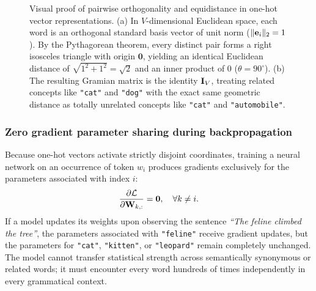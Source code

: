 \documentclass[../../../main.tex]{subfiles}
\begin{document}
\begin{figure}[htbp]
\caption{Visual proof of pairwise orthogonality and equidistance in one-hot vector representations. (a) In $V$-dimensional Euclidean space, each word is an orthogonal standard basis vector of unit norm ($\|\mathbf{e}_i\|_2 = 1$). By the Pythagorean theorem, every distinct pair forms a right isosceles triangle with origin $\mathbf{0}$, yielding an identical Euclidean distance of $\sqrt{1^2 + 1^2} = \sqrt{2}$ and an inner product of $0$ ($\theta = 90^\circ$). (b) The resulting Gramian matrix is the identity $\mathbf{I}_V$, treating related concepts like \texttt{"cat"} and \texttt{"dog"} with the exact same geometric distance as totally unrelated concepts like \texttt{"cat"} and \texttt{"automobile"}.}
\label{fig:onehot_orthogonality_geometry}
\end{figure}

\subsubsection{Zero gradient parameter sharing during backpropagation}
Because one-hot vectors activate strictly disjoint coordinates, training a neural network on an occurrence of token $w_i$ produces gradients exclusively for the parameters associated with index $i$:
\begin{equation}
\label{eq:weight_update_isolation}
\frac{\partial \mathcal{L}}{\partial \mathbf{W}_{k, :}} = \mathbf{0}, \quad \forall k \neq i.
\end{equation}
If a model updates its weights upon observing the sentence \emph{``The feline climbed the tree''}, the parameters associated with \texttt{"feline"} receive gradient updates, but the parameters for \texttt{"cat"}, \texttt{"kitten"}, or \texttt{"leopard"} remain completely unchanged. The model cannot transfer statistical strength across semantically synonymous or related words; it must encounter every word hundreds of times independently in every grammatical context.
\end{document}
